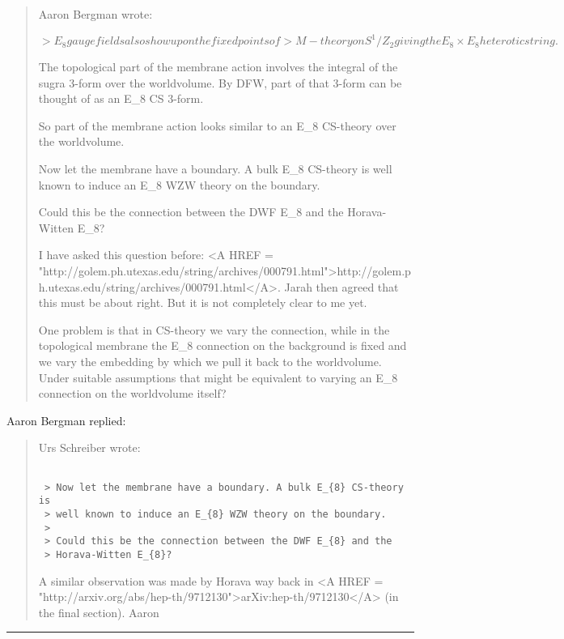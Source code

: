 \begin{quote}
 Aaron Bergman wrote:

$$

 > E_{8} gauge fields also show up on the fixed points of 
 > M-theory on S^{1}/Z_{2} giving the E_{8} \times  E_{8} heterotic string.
$$
    

 The topological part of the membrane action involves the integral
 of the sugra 3-form over the worldvolume.  By DFW, part of that
 3-form can be thought of as an E_{8} CS 3-form.

 So part of the membrane action looks similar to an E_{8} CS-theory
 over the worldvolume.

 Now let the membrane have a boundary. A bulk E_{8} CS-theory is
 well known to induce an E_{8} WZW theory on the boundary.

 Could this be the connection between the DWF E_{8} and the
 Horava-Witten E_{8}?

 I have asked this question before: <A HREF =
 "http://golem.ph.utexas.edu/string/archives/000791.html">http://golem.ph.utexas.edu/string/archives/000791.html</A>. Jarah
 then agreed that this must be about right. But it is not completely
 clear to me yet.

 One problem is that in CS-theory we vary the connection, while in
 the topological membrane the E_{8} connection on the background is fixed
 and we vary the embedding by which we pull it back to the worldvolume.
 Under suitable assumptions that might be equivalent to varying an E_{8}
 connection on the worldvolume itself? 
\end{quote}

Aaron Bergman replied:

\begin{quote} 
 Urs Schreiber wrote:

\begin{verbatim}

 > Now let the membrane have a boundary. A bulk E_{8} CS-theory is
 > well known to induce an E_{8} WZW theory on the boundary.
 >
 > Could this be the connection between the DWF E_{8} and the
 > Horava-Witten E_{8}?
\end{verbatim}
    
 A similar observation was made by Horava way back in <A HREF = "http://arxiv.org/abs/hep-th/9712130">arXiv:hep-th/9712130</A> (in
 the final section).
 Aaron 
\end{quote}


\par\noindent\rule{\textwidth}{0.4pt}
